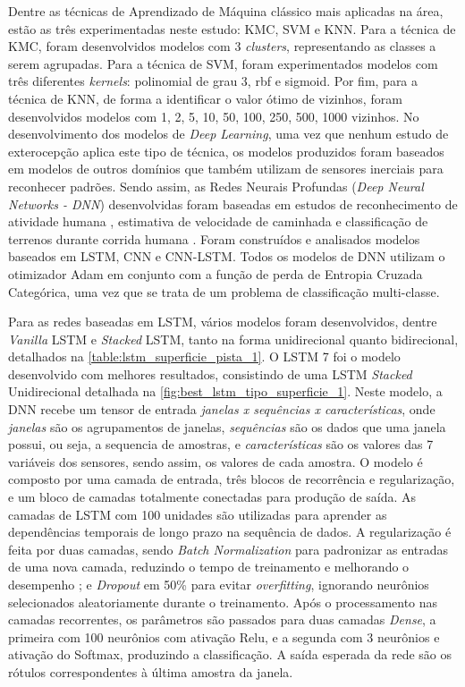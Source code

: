 Dentre as técnicas de Aprendizado de Máquina clássico mais aplicadas na área, estão as três experimentadas neste estudo: KMC, SVM e KNN. Para a técnica de KMC, foram desenvolvidos modelos com 3 \textit{clusters}, representando as classes a serem agrupadas. Para a técnica de SVM, foram experimentados modelos com três diferentes \textit{kernels}: polinomial de grau 3, rbf e sigmoid. Por fim, para a técnica de KNN, de forma a identificar o valor ótimo de vizinhos, foram desenvolvidos modelos com 1, 2, 5, 10, 50, 100, 250, 500, 1000 vizinhos. No desenvolvimento dos modelos de \textit{Deep Learning}, uma vez que nenhum estudo de exterocepção aplica este tipo de técnica, os modelos produzidos foram baseados em modelos de outros domínios que também utilizam de sensores inerciais para reconhecer padrões. Sendo assim, as Redes Neurais Profundas (\textit{Deep Neural Networks - DNN}) desenvolvidas foram baseadas em estudos de reconhecimento de atividade humana \cite{Deep2019,Alemayoh2019,Chen2015,Yang2018,Zebin2018,Zebin2019,Wang2019,Ahmad2019}, estimativa de velocidade de caminhada \cite{Shrestha2018} e classificação de terrenos durante corrida humana \cite{Dixon2019}. Foram construídos e analisados modelos baseados em LSTM, CNN e CNN-LSTM. Todos os modelos de DNN utilizam o otimizador Adam em conjunto com a função de perda de Entropia Cruzada Categórica, uma vez que se trata de um problema de classificação multi-classe.

Para as redes baseadas em LSTM, vários modelos foram desenvolvidos, dentre \textit{Vanilla} LSTM e \textit{Stacked} LSTM, tanto na forma unidirecional quanto bidirecional, detalhados na \autoref{table:lstm_superficie_pista_1}. O LSTM 7 foi o modelo desenvolvido com melhores resultados, consistindo de uma LSTM \textit{Stacked} Unidirecional detalhada na \autoref{fig:best_lstm_tipo_superficie_1}. Neste modelo, a DNN recebe um tensor de entrada \emph{janelas x sequências x características}, onde \emph{janelas} são os agrupamentos de janelas, \emph{sequências} são os dados que uma janela possui, ou seja, a sequencia de amostras, e \emph{características} são os valores das 7 variáveis dos sensores, sendo assim, os valores de cada amostra. O modelo é composto por uma camada de entrada, três blocos de recorrência e regularização, e um bloco de camadas totalmente conectadas para produção de saída. As camadas de LSTM com 100 unidades são utilizadas para aprender as dependências temporais de longo prazo na sequência de dados. A regularização é feita por duas camadas, sendo \textit{Batch Normalization} para padronizar as entradas de uma nova camada, reduzindo o tempo de treinamento e melhorando o desempenho \cite{Zebin2018}; e \textit{Dropout} em 50\% para evitar \textit{overfitting}, ignorando neurônios selecionados aleatoriamente durante o treinamento. Após o processamento nas camadas recorrentes, os parâmetros são passados para duas camadas \textit{Dense}, a primeira com 100 neurônios com ativação Relu, e a segunda com 3 neurônios e ativação do Softmax, produzindo a classificação. A saída esperada da rede são os rótulos correspondentes à última amostra da janela.

